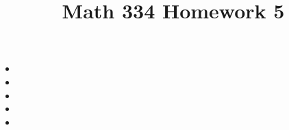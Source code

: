 \documentclass{article}
\title{Math 334 Homework 5}
\begin{document}
\maketitle
\begin{itemize}[label=]
	\item 
	\item 
	\item 
	\item 
	\item 
\end{itemize}
\end{document}
